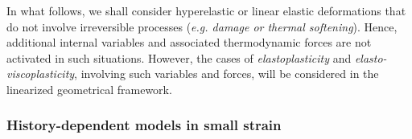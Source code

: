 In what follows, we shall consider hyperelastic or linear elastic deformations that do not involve irreversible processes (\textit{e.g. damage or thermal softening}). Hence, additional internal variables and associated thermodynamic forces are not activated in such situations. However, the cases of \textit{elastoplasticity} and \textit{elasto-viscoplasticity}, involving such variables and forces, will be considered in the linearized geometrical framework.

\subsubsection*{History-dependent models in small strain}
